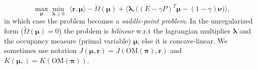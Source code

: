 \begin{equation}
    \max_{\bm{\mu}} \min_{\bm{\lambda} \geq 0 }~~ 
    \langle \bm{r}, \bm{\bm{\mu}} \rangle
    - \tilde{\Omega}(\bm{\mu}) 
    + \langle \bm{\lambda}, \big((E-\gamma P)^T  \bm{\mu} - (1-\gamma) \bm{\nu} \big)\rangle,
    \label{eq:pb_occupancy_lagrangian_opt}
\end{equation}
in which case the problem becomes a \textit{saddle-point problem}. In the unregularized form ($\tilde{\Omega}(\bm{\mu})=0$) the problem is \textit{bilinear} w.r.t the lagrangian multiplier $\bm{\lambda}$ and the occupancy measure (primal variable) $\bm{\mu}$, else it is concave-linear. We sometimes use notation $J(\bm{\mu},\bm{r}) = J(\text{OM}(\bm{\pi}),\bm{r})$ and $K(\bm{\mu},) = K(\text{OM}(\bm{\pi}))$.